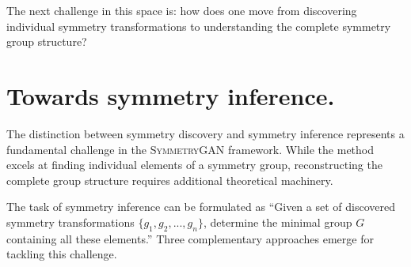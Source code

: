             The next challenge in this space is: how does one move from discovering individual symmetry transformations to understanding the complete symmetry group structure?

\section{Towards symmetry inference.}
            The distinction between symmetry discovery and symmetry inference represents a fundamental challenge in the \textsc{SymmetryGAN} framework.
            While the method excels at finding individual elements of a symmetry group, reconstructing the complete group structure requires additional theoretical machinery.
            
            The task of symmetry inference can be formulated as ``Given a set of discovered symmetry transformations \(\{g_1, g_2, ..., g_n\}\), determine the minimal group \(G\) containing all these elements.''
            Three complementary approaches emerge for tackling this challenge.
